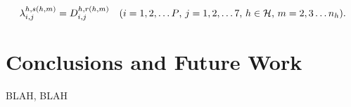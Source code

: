 \documentclass{article}
\begin{document}
\begin{equation}
\label{eqn:flowcons}
\lambda_{i,j}^{h,s(h,m)}=D_{i,j}^{h,r(h,m)} \quad \text{($i=1,2,\ldots P$, $j=1,2,\ldots 7$, $h \in {\cal H}$, $m=2,3\ldots n_{h}$).}
\end{equation}
\section{Conclusions and Future Work}
\label{sec-conclusions}


BLAH, BLAH








%
\end{document}
